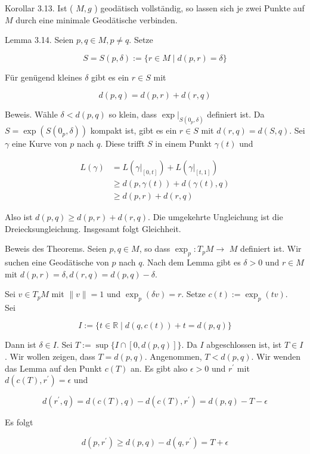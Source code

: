 \documentclass[10pt, letterpaper]{article}
\begin{document}
Korollar 3.13. Ist ( $M, g$ ) geodätisch vollständig, so lassen sich je zwei Punkte auf $M$ durch eine minimale Geodätische verbinden.

Lemma 3.14. Seien $p, q \in M, p \neq q$. Setze

$$
S=S(p, \delta):=\{r \in M \mid d(p, r)=\delta\}
$$

Für genügend kleines $\delta$ gibt es ein $r \in S$ mit

$$
d(p, q)=d(p, r)+d(r, q)
$$

Beweis. Wähle $\delta<d(p, q)$ so klein, dass $\left.\exp \right|_{S\left(0_{p}, \delta\right)}$ definiert ist. Da $S=\exp \left(S\left(0_{p}, \delta\right)\right)$ kompakt ist, gibt es ein $r \in S$ mit $d(r, q)=d(S, q)$. Sei $\gamma$ eine Kurve von $p$ nach $q$. Diese trifft $S$ in einem Punkt $\gamma(t)$ und

$$
\begin{aligned}
L(\gamma) & =L\left(\left.\gamma\right|_{[0, t]}\right)+L\left(\left.\gamma\right|_{[t, 1]}\right) \\
& \geq d(p, \gamma(t))+d(\gamma(t), q) \\
& \geq d(p, r)+d(r, q)
\end{aligned}
$$

Also ist $d(p, q) \geq d(p, r)+d(r, q)$. Die umgekehrte Ungleichung ist die Dreiecksungleichung. Insgesamt folgt Gleichheit.

Beweis des Theorems. Seien $p, q \in M$, so dass $\exp _{p}: T_{p} M \rightarrow$ $M$ definiert ist. Wir suchen eine Geodätische von $p$ nach $q$. Nach dem Lemma gibt es $\delta>0$ und $r \in M$ mit $d(p, r)=\delta, d(r, q)=d(p, q)-\delta$.

Sei $v \in T_{p} M$ mit $\|v\|=1$ und $\exp _{p}(\delta v)=r$. Setze $c(t):=\exp _{p}(t v)$.\\
Sei

$$
I:=\{t \in \mathbb{R} \mid d(q, c(t))+t=d(p, q)\}
$$

Dann ist $\delta \in I$. Sei $T:=\sup \{I \cap[0, d(p, q)]\}$. Da $I$ abgeschlossen ist, ist $T \in I$. Wir wollen zeigen, dass $T=d(p, q)$. Angenommen, $T<d(p, q)$. Wir wenden das Lemma auf den Punkt $c(T)$ an. Es gibt also $\epsilon>0$ und $r^{\prime}$ mit $d\left(c(T), r^{\prime}\right)=\epsilon$ und

$$
d\left(r^{\prime}, q\right)=d(c(T), q)-d\left(c(T), r^{\prime}\right)=d(p, q)-T-\epsilon
$$

Es folgt

$$
d\left(p, r^{\prime}\right) \geq d(p, q)-d\left(q, r^{\prime}\right)=T+\epsilon
$$
\end{document}
